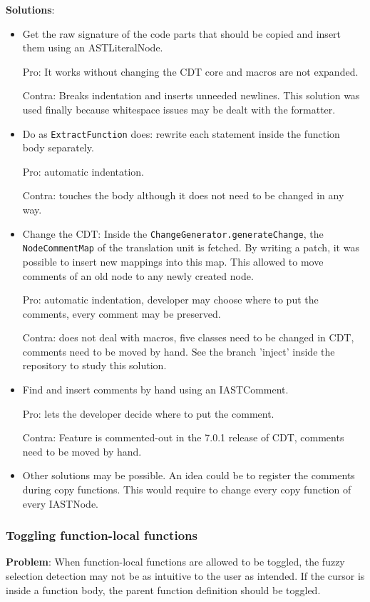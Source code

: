 \textbf{Solutions}:
\begin{itemize}
\item Get the raw signature of the code parts that should be copied and insert 
them using an ASTLiteralNode. 

Pro: It works without changing the CDT core and macros are not expanded. 

Contra: Breaks indentation and inserts unneeded newlines. This solution was used 
finally because whitespace issues may be dealt with the formatter.
\item Do as \texttt{ExtractFunction} does: rewrite each statement inside the 
function body separately. 

Pro: automatic indentation. 

Contra: touches the body although it does not need to be changed in any way. 
\item Change the CDT: Inside the \texttt{ChangeGenerator.generateChange}, the 
\texttt{NodeCommentMap} of the translation unit is fetched. By writing a patch, 
it was possible to insert new mappings into this map. This allowed to move 
comments of an old node to any newly created node. 

Pro: automatic indentation, developer may choose where to put the comments, 
every comment may be preserved. 

Contra: does not deal with macros, five classes need to be changed in CDT, 
comments need to be moved by hand. See the branch 'inject' inside the repository 
to study this solution.
\item Find and insert comments by hand using an IASTComment. 

Pro: lets the developer decide where to put the comment. 

Contra: Feature is commented-out in the 7.0.1 release of CDT, comments need to 
be moved by hand.
\item Other solutions may be possible. An idea could be to register the comments 
during copy functions. This would require to change every copy function of every 
IASTNode. 
\end{itemize}

\subsubsection{Toggling function-local functions}
\textbf{Problem}: When function-local functions are allowed to be toggled, the 
fuzzy selection detection may not be as intuitive to the user as intended. If 
the cursor is inside a function body, the parent function definition should be 
toggled.

